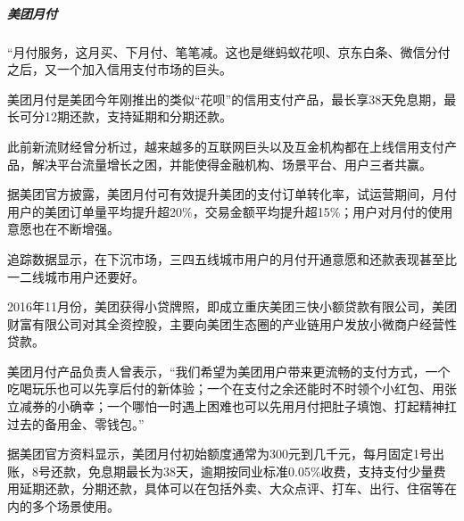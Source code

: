 \documentclass[letterpaper,10pt,english]{sphinxmanual}
\begin{document}
\subparagraph{美团月付}
\label{\detokenize{chapter_AI_company/meituan:id13}}
“月付服务，这月买、下月付、笔笔减。这也是继蚂蚁花呗、京东白条、微信分付之后，又一个加入信用支付市场的巨头。%
\begin{footnote}[1038]\sphinxAtStartFootnote
{}
%
\end{footnote}

美团月付是美团今年刚推出的类似“花呗”的信用支付产品，最长享38天免息期，最长可分12期还款，支持延期和分期还款。

此前新流财经曾分析过，越来越多的互联网巨头以及互金机构都在上线信用支付产品，解决平台流量增长之困，并能使得金融机构、场景平台、用户三者共赢。

据美团官方披露，美团月付可有效提升美团的支付订单转化率，试运营期间，月付用户的美团订单量平均提升超20\%，交易金额平均提升超15\%；用户对月付的使用意愿也在不断增强。

追踪数据显示，在下沉市场，三四五线城市用户的月付开通意愿和还款表现甚至比一二线城市用户还要好。%
\begin{footnote}[1039]\sphinxAtStartFootnote
{}
%
\end{footnote}

2016年11月份，美团获得小贷牌照，即成立重庆美团三快小额贷款有限公司，美团财富有限公司对其全资控股，主要向美团生态圈的产业链用户发放小微商户经营性贷款。%
\begin{footnote}[1040]\sphinxAtStartFootnote
{}
%
\end{footnote}

美团月付产品负责人曾表示，“我们希望为美团用户带来更流畅的支付方式，一个吃喝玩乐也可以先享后付的新体验；一个在支付之余还能时不时领个小红包、用张立减券的小确幸；一个哪怕一时遇上困难也可以先用月付把肚子填饱、打起精神扛过去的备用金、零钱包。”

据美团官方资料显示，美团月付初始额度通常为300元到几千元，每月固定1号出账，8号还款，免息期最长为38天，逾期按同业标准0.05\%收费，支持支付少量费用延期还款，分期还款，具体可以在包括外卖、大众点评、打车、出行、住宿等在内的多个场景使用。%
\begin{footnote}[1041]\sphinxAtStartFootnote
{}
%
\end{footnote}
\end{document}
